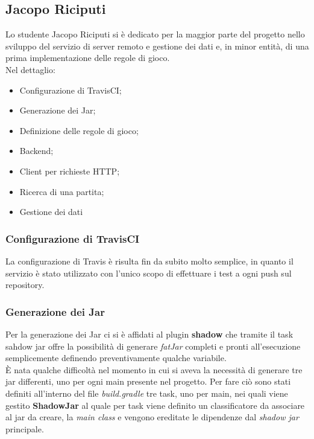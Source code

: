         \subsection{Jacopo Riciputi}\label{subsec:riciputi}
	  Lo studente Jacopo Riciputi si è dedicato per la maggior parte del progetto nello sviluppo del servizio di server remoto e gestione dei dati e, in minor entità, di una prima implementazione delle regole di gioco. 
	  \\
	  Nel dettaglio: 
	    \begin{itemize}
	     \item Configurazione di TravisCI;
	     \item Generazione dei Jar;
	     \item Definizione delle regole di gioco;
	     \item Backend;
	     \item Client per richieste HTTP;
	     \item Ricerca di una partita;
	     \item Gestione dei dati
	    \end{itemize}
	    
	
	\subsubsection{Configurazione di TravisCI}
	  La configurazione di Travis è risulta fin da subito molto semplice, in quanto il servizio è stato utilizzato con l'unico scopo di effettuare i test a ogni push sul repository.
	 
	\subsubsection{Generazione dei Jar} 
	  Per la generazione dei Jar ci si è affidati al plugin \textbf{shadow} che tramite il task sahdow jar
	  offre la possibilità di generare \textit{fatJar} completi e pronti all'esecuzione semplicemente definendo preventivamente qualche variabile. \\
	  È nata qualche difficoltà nel momento in cui si aveva la necessità di generare tre jar differenti, uno per ogni main presente nel progetto. 
	  Per fare ciò sono stati definiti all'interno del file \textit{build.gradle} tre task, uno per main, nei quali viene gestito \textbf{ShadowJar} 
	  al quale per task viene definito un classificatore da associare al jar da creare, la \textit{main class} 
	  e vengono ereditate le dipendenze dal \textit{shadow jar} principale.
	  

